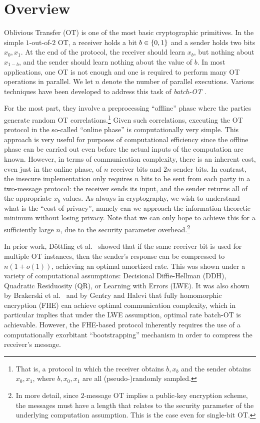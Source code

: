 \section{Overview}
\label{sec:overview-r1ot}
Oblivious Transfer (OT) \cite{RabinOT,C:EveGolLem82} is one of the most basic cryptographic primitives. In the simple $1$-out-of-$2$ OT, a receiver holds a bit $b \in \{0,1\}$ and a sender holds two bits $x_0, x_1$. At the end of the protocol, the receiver should learn $x_b$, but nothing about $x_{1-b}$, and the sender should learn nothing about the value of $b$. In most applications, one OT is not enough and one is required to perform many OT operations in parallel. We let $n$ denote the number of parallel executions. Various techniques have been developed to address this task of \emph{batch-OT} \cite{C:IKNP03,C:BCGIKS19,CCS:BCGIKRS19}.

For the most part, they involve a preprocessing ``offline'' phase where the parties generate random OT correlations.\footnote{That is, a protocol in which the receiver obtains $b, x_b$ and the sender obtains $x_0,x_1$, where $b, x_0, x_1$ are all (pseudo-)randomly sampled.} Given such correlations, executing the OT protocol in the so-called ``online phase'' is computationally very simple. This approach is very useful for purposes of computational efficiency since the offline phase can be carried out even before the actual inputs of the computation are known. However, in terms of communication complexity, there is an inherent cost, even just in the online phase, of $n$ receiver bits and $2n$ sender bits. In contrast, the insecure implementation only requires $n$ bits to be sent from each party in a two-message protocol: the receiver sends its input, and the sender returns all of the appropriate $x_b$ values. As always in cryptography, we wish to understand what is the ``cost of privacy'', namely can we approach the information-theoretic minimum without losing privacy. Note that we can only hope to achieve this for a sufficiently large $n$, due to the security parameter overhead.\footnote{In more detail, since $2$-message OT implies a public-key encryption scheme, the messages must have a length that relates to the security parameter of the underlying computation assumption. This is the case even for single-bit OT.}

In prior work, D\"{o}ttling et al.~\cite{C:DGIMMO19} showed that if the same receiver bit is used for multiple OT instances, then the sender's response can be compressed to $n(1+o(1))$, achieving an optimal amortized rate. This was shown under a variety of computational assumptions: Decisional Diffie-Hellman (DDH), Quadratic Residuosity (QR), or Learning with Errors (LWE). It was also shown by Brakerski et al.~\cite{TCC:BDGM19} and by Gentry and Halevi \cite{TCC:GenHal19} that fully homomorphic encryption (FHE) can achieve optimal communication complexity, which in particular implies that under the LWE assumption, optimal rate batch-OT is achievable. However, the FHE-based protocol inherently requires the use of a computationally exorbitant ``bootstrapping'' mechanism in order to compress the receiver's message.



